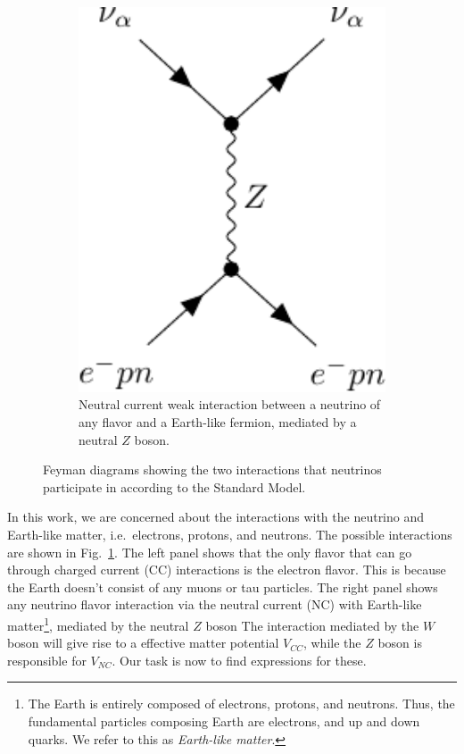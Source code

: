 \begin{figure}
    \quad
    \begin{subfigure}{0.3\textwidth}
        \includegraphics[width=1\textwidth]{figures/z-boson.pdf} 
        \caption{Neutral current weak interaction between a neutrino of any flavor and a Earth-like fermion,
        mediated by a neutral $Z$ boson.}
    \end{subfigure}%
    \caption{Feyman diagrams showing the two interactions that neutrinos participate in according to the Standard Model.}\label{fig:w_and_z}
\end{figure}
In this work, we are concerned about the interactions with the neutrino and Earth-like matter, i.e.~electrons, protons, and neutrons. 
The possible interactions are shown in Fig.~\ref{fig:w_and_z}. The left panel shows that the only flavor that can go through charged current (CC) 
interactions is the electron flavor. This is because the Earth doesn't consist of any muons or tau particles. 
The right panel shows any neutrino flavor interaction via the neutral current (NC) with Earth-like matter\footnote{The Earth is entirely composed
of electrons, protons, and neutrons. Thus, the fundamental particles composing Earth are electrons, and up and down quarks. We refer to this as \emph{Earth-like matter}.}, mediated by the neutral $Z$ boson
The interaction mediated by the $W$ boson will give rise to a effective matter potential $V_{CC}$, while
the $Z$ boson is responsible for $V_{NC}$. Our task is now to find expressions for these.

